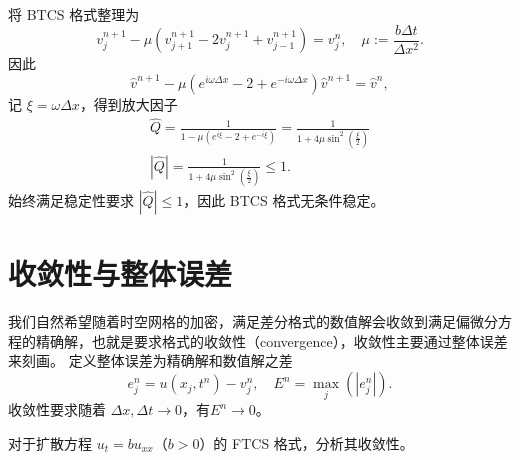 \begin{solution*}
    将 BTCS 格式整理为
    \[
        v_j^{n+1} - \mu \left( v_{j+1}^{n+1} - 2 v_j^{n+1} + v_{j-1}^{n+1} \right) = v_j^n, \quad \mu := \frac{b \Delta t}{\Delta x^2}.
    \]
    因此
    \[
        \hat{v}^{n+1} - \mu (e^{i \omega \Delta x} - 2 + e^{- i \omega \Delta x}) \hat{v}^{n+1} = \hat{v}^n,
    \]
    记 $\xi = \omega \Delta x$，得到放大因子
    \begin{gather*}
        \widehat{Q} ={} \frac{1}{1 - \mu (e^{i \xi} - 2 + e^{- i \xi})} =  \frac{1}{1 + 4 \mu \sin^2(\frac{\xi}2)} \\
        |\widehat{Q}| ={} \frac{1}{1 + 4 \mu \sin^2(\frac{\xi}2)} \le 1.
    \end{gather*}
    始终满足稳定性要求 $|\widehat{Q}| \le 1$，因此 BTCS 格式无条件稳定。
\end{solution*}


\section{收敛性与整体误差}

我们自然希望随着时空网格的加密，满足差分格式的数值解会收敛到满足偏微分方程的精确解，也就是要求格式的收敛性（convergence），收敛性主要通过整体误差来刻画。
定义整体误差为精确解和数值解之差
\[
    e_j^n = u(x_j,t^n) - v_j^n,\quad E^n = \max_j(|e_j^n|).
\]
收敛性要求随着 $\Delta x,\Delta t \to 0$，有$E^n \to 0$。

\begin{example}
    对于扩散方程 $u_t = b u_{xx}$（$b>0$）的 FTCS 格式，分析其收敛性。
\end{example}

